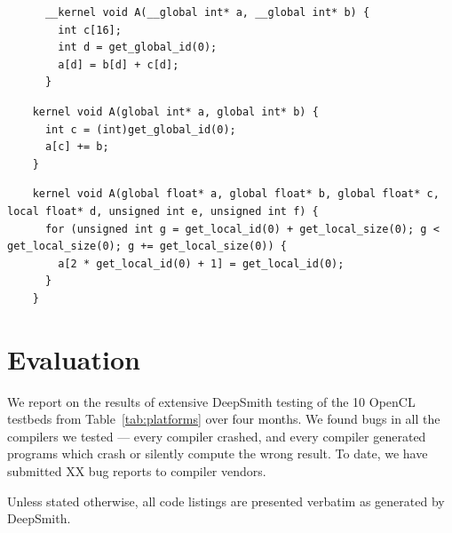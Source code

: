 \newsavebox{\UninitRead}
\begin{lrbox}{\UninitRead}
  \hspace{1.5em}
  \begin{lstlisting}
      __kernel void A(__global int* a, __global int* b) {
        int c[16];
        int d = get_global_id(0);
        a[d] = b[d] + c[d];
      }
  \end{lstlisting}
\end{lrbox}

\newsavebox{\IntelPtrAssertion}
\begin{lrbox}{\IntelPtrAssertion}
  \hspace{1.5em}
  \begin{lstlisting}
    kernel void A(global int* a, global int* b) {
      int c = (int)get_global_id(0);
      a[c] += b;
    }
  \end{lstlisting}
\end{lrbox}

\newsavebox{\IntelScalarAssertion}
\begin{lrbox}{\IntelScalarAssertion}
  \hspace{1.5em}
  \begin{lstlisting}
    kernel void A(global float* a, global float* b, global float* c, local float* d, unsigned int e, unsigned int f) {
      for (unsigned int g = get_local_id(0) + get_local_size(0); g < get_local_size(0); g += get_local_size(0)) {
        a[2 * get_local_id(0) + 1] = get_local_id(0);
      }
    }
  \end{lstlisting}
\end{lrbox}



\section{Evaluation}%
\label{sec:eval}

We report on the results of extensive DeepSmith testing of the 10 OpenCL testbeds from Table~\ref{tab:platforms} over four months. We found bugs in all the compilers we tested --- every compiler crashed, and every compiler generated programs which crash or silently compute the wrong result. To date, we have submitted XX bug reports to compiler vendors. %

Unless stated otherwise, all code listings are presented verbatim as generated by DeepSmith.

